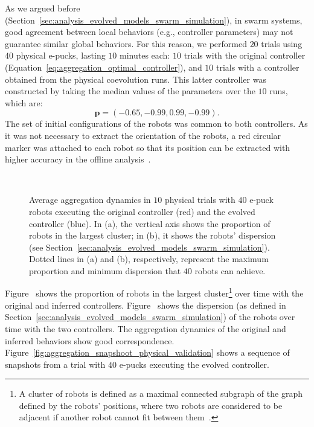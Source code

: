 As we argued before (Section~\ref{sec:analysis_evolved_models_swarm_simulation}), in swarm systems, good agreement between local behaviors (e.g., controller parameters) may not guarantee similar global behaviors. For this reason, we performed $20$ trials using $40$ physical e-pucks, lasting $10$ minutes each: $10$ trials with the original controller (Equation~\eqref{eq:aggregation_optimal_controller}), and $10$ trials with a controller obtained from the physical coevolution runs. This latter controller was constructed by taking the median values of the parameters over the $10$ runs, which are:
$$
\mathbf{p}=\left(-0.65, -0.99, 0.99, -0.99\right).
$$
The set of initial configurations of the robots was common to both controllers. As it was not necessary to extract the orientation of the robots, a red circular marker was attached to each robot so that its position can be extracted with higher accuracy in the offline analysis~\cite{Gauci2014_ijrr}.
%
\begin{figure}[!t]%
	\centering
		\\
		\caption{Average aggregation dynamics in $10$ physical trials with $40$ e-puck robots executing the original controller (red) and the evolved controller (blue). In (a), the vertical axis shows the proportion of robots in the largest cluster; in (b), it shows the robots' dispersion (see Section~\ref{sec:analysis_evolved_models_swarm_simulation}). Dotted lines in (a) and (b), respectively, represent the maximum proportion and minimum dispersion that $40$ robots can achieve.}
		\label{fig:aggregation_dynamics_physical}
\end{figure}
%
Figure~ shows the proportion of robots in the largest cluster\footnote{A cluster of robots is defined as a maximal connected subgraph of the graph defined by the robots' positions, where two robots are considered to be adjacent if another robot cannot fit between them~\cite{Gauci2014_ijrr}.} over time with the original and inferred controllers. Figure~ shows the dispersion (as defined in Section~\ref{sec:analysis_evolved_models_swarm_simulation}) of the robots over time with the two controllers. The aggregation dynamics of the original and inferred behaviors show good correspondence. Figure~\ref{fig:aggregation_snapshoot_physical_validation} shows a sequence of snapshots from a trial with $40$ e-pucks executing the evolved controller.

